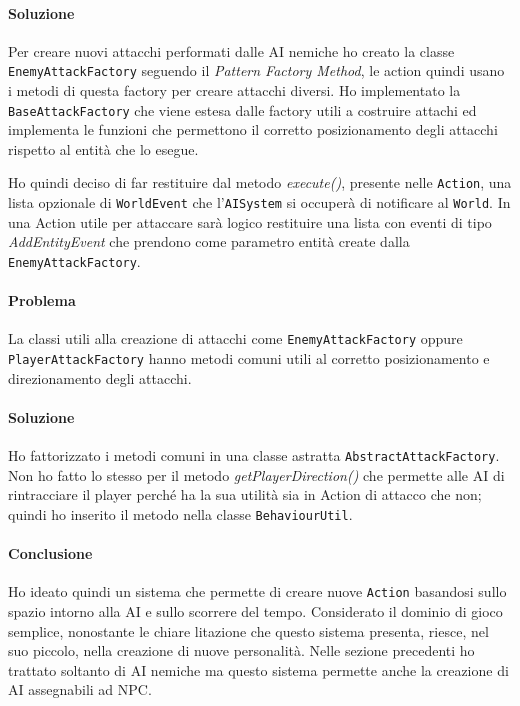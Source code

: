 \documentclass[a4paper,12pt]{report}
\begin{document}
\paragraph{Soluzione}
Per creare nuovi attacchi performati dalle AI nemiche ho creato la classe \texttt{EnemyAttackFactory} seguendo il 
\textit{Pattern Factory Method}, le action quindi usano i metodi di questa factory per creare attacchi 
diversi.
Ho implementato la \texttt{BaseAttackFactory} che viene estesa dalle factory utili a costruire attachi ed 
implementa le funzioni che permettono il corretto posizionamento degli attacchi rispetto al entità che lo esegue.

Ho quindi deciso di far restituire dal metodo \textit{execute()}, presente nelle \texttt{Action}, una 
lista opzionale di \texttt{WorldEvent} che l'\texttt{AISystem} si occuperà di notificare al \texttt{World}.
In una Action utile per attaccare sarà logico restituire una lista con eventi di tipo \textit{AddEntityEvent}
che prendono come parametro entità create dalla \texttt{EnemyAttackFactory}.

\paragraph{Problema}
La classi utili alla creazione di attacchi come \texttt{EnemyAttackFactory} oppure \texttt{PlayerAttackFactory}
hanno metodi comuni utili al corretto posizionamento e direzionamento degli attacchi.
\paragraph{Soluzione}
Ho fattorizzato i metodi comuni in una classe astratta \texttt{AbstractAttackFactory}.
Non ho fatto lo stesso per il metodo \textit{getPlayerDirection()} che permette alle
AI di rintracciare il player perché ha la sua utilità sia in Action di attacco che non;
quindi ho inserito il metodo nella classe \texttt{BehaviourUtil}. 

\paragraph{Conclusione}
Ho ideato quindi un sistema che permette di creare nuove \texttt{Action} basandosi sullo spazio 
intorno alla AI e sullo scorrere del tempo. 
Considerato il dominio di gioco semplice, nonostante le chiare litazione che questo sistema presenta, 
riesce, nel suo piccolo, nella creazione di nuove personalità.
Nelle sezione precedenti ho trattato soltanto di AI nemiche ma questo sistema
permette anche la creazione di AI assegnabili ad NPC.
\end{document}
